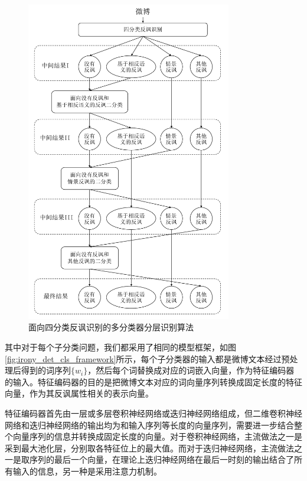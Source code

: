 \begin{figure}[H]
  \centering
  \includegraphics[width=0.8\textwidth]{img/irony_det_system.pdf}
  \caption{面向四分类反讽识别的多分类器分层识别算法}
  \label{fig:irony_det_system}
\end{figure}

其中对于每个子分类问题，我们都采用了相同的模型框架，如图\ref{fig:irony_det_cls_framework}所示，每个子分类器的输入都是微博文本经过预处理后得到的词序列$\{w_i\}$，然后每个词替换成对应的词嵌入向量，作为特征编码器的输入。特征编码器的目的是把微博文本对应的词向量序列转换成固定长度的特征向量，作为其反讽属性相关的表示向量。

特征编码器首先由一层或多层卷积神经网络或迭归神经网络组成，但二维卷积神经网络和迭归神经网络的输出均为和输入序列等长度的向量序列，需要进一步结合整个向量序列的信息并转换成固定长度的向量。对于卷积神经网络，主流做法之一是采到最大池化层，分别取各特征位上的最大值。而对于迭归神经网络，主流做法之一是取序列的最后一个向量，在理论上迭归神经网络在最后一时刻的输出结合了所有输入的信息，另一种是采用注意力机制。

